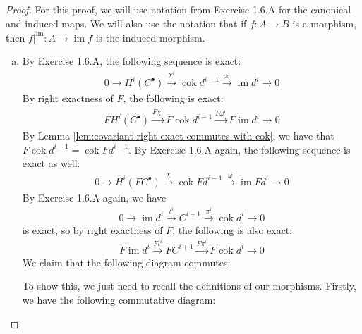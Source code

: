 \documentclass{article}
\DeclareMathOperator{\im}{\mathrm{im}}
\DeclareMathOperator{\cok}{\mathrm{cok}}
\begin{document}
\begin{proof}
    For this proof, we will use notation from Exercise 1.6.A for the canonical and induced maps. We will also use the notation that if $f:A\to B$ is a morphism, then $f\vert^{\im} :A\to \im f$ is the induced morphism.
    \begin{enumerate}[(a)]
        \item By Exercise 1.6.A, the following sequence is exact:
    \begin{align*}
        0\rightarrow H^i(C^\bullet) \xrightarrow{\chi^i}\cok d^{i-1} \xrightarrow{\omega^i}\im d^i\rightarrow 0
    \end{align*}
        By right exactness of $F$, the following is exact:
        \begin{align*}
            FH^i(C^\bullet) \xrightarrow{F\chi^i} F\cok d^{i-1} \xrightarrow{F \omega^i} F\im d^i \rightarrow 0
        \end{align*}
        By Lemma \ref{lem:covariant right exact commutes with cok}, we have that $F\cok d^{i-1}=\cok Fd^{i-1}$. By Exercise 1.6.A again, the following sequence is exact as well:
        \begin{align*}
            0\rightarrow H^i(FC^\bullet) \xrightarrow{\chi}\cok Fd^{i-1} \xrightarrow{\omega}\im Fd^i\rightarrow 0
        \end{align*}
        By Exercise 1.6.A again, we have
        \begin{align*}
            0\rightarrow \im d^i \xrightarrow{\iota^i} C^{i+1} \xrightarrow{\pi^i} \cok d^i \rightarrow 0
        \end{align*}
        is exact, so by right exactness of $F$, the following is also exact:
        \begin{align*}
            F\im d^i \xrightarrow{F\iota^{i}} FC^{i+1} \xrightarrow{F\pi^i} F\cok d^i \rightarrow 0
        \end{align*}
    We claim that the following diagram commutes:
    \begin{center}
    \end{center}
   To show this, we just need to recall the definitions of our morphisms. Firstly, we have the following commutative diagram:
   \begin{center}

\end{center}
\end{enumerate}
\end{proof}
\end{document}
